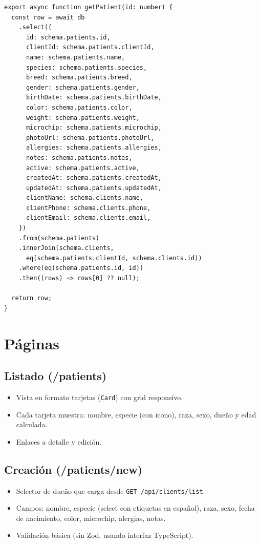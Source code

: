 \begin{lstlisting}[style=typescript, caption=getPatient - Seleccion explicita de columnas]
export async function getPatient(id: number) {
  const row = await db
    .select({
      id: schema.patients.id,
      clientId: schema.patients.clientId,
      name: schema.patients.name,
      species: schema.patients.species,
      breed: schema.patients.breed,
      gender: schema.patients.gender,
      birthDate: schema.patients.birthDate,
      color: schema.patients.color,
      weight: schema.patients.weight,
      microchip: schema.patients.microchip,
      photoUrl: schema.patients.photoUrl,
      allergies: schema.patients.allergies,
      notes: schema.patients.notes,
      active: schema.patients.active,
      createdAt: schema.patients.createdAt,
      updatedAt: schema.patients.updatedAt,
      clientName: schema.clients.name,
      clientPhone: schema.clients.phone,
      clientEmail: schema.clients.email,
    })
    .from(schema.patients)
    .innerJoin(schema.clients,
      eq(schema.patients.clientId, schema.clients.id))
    .where(eq(schema.patients.id, id))
    .then((rows) => rows[0] ?? null);

  return row;
}
\end{lstlisting}

\section{P\'aginas}

\subsection{Listado (/patients)}

\begin{itemize}[leftmargin=*]
    \item Vista en formato tarjetas (\texttt{Card}) con grid responsivo.
    \item Cada tarjeta muestra: nombre, especie (con icono), raza, sexo,
          due\~no y edad calculada.
    \item Enlaces a detalle y edici\'on.
\end{itemize}

\subsection{Creaci\'on (/patients/new)}

\begin{itemize}[leftmargin=*]
    \item Selector de due\~no que carga desde \texttt{GET /api/clients/list}.
    \item Campos: nombre, especie (select con etiquetas en espa\~nol),
          raza, sexo, fecha de nacimiento, color, microchip, alergias, notas.
    \item Validaci\'on b\'asica (sin Zod, usando interfaz TypeScript).
\end{itemize}


